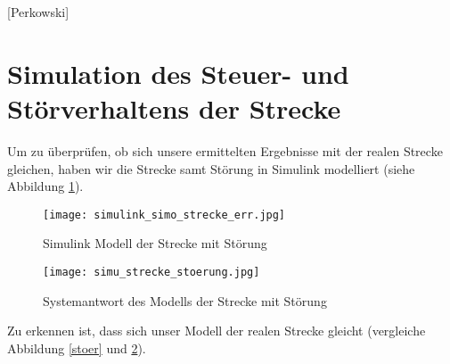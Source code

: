 
\newpage

[Perkowski]
\section{Simulation des Steuer- und Störverhaltens der Strecke} \label{Kapitel5}
Um zu überprüfen, ob sich unsere ermittelten Ergebnisse mit der realen Strecke gleichen, haben wir die Strecke samt Störung in Simulink modelliert (siehe Abbildung \ref{simustreckestor}).

\begin{figure}[h]
	\begin{center}
		\texttt{[image: simulink\_simo\_strecke\_err.jpg]}
		\caption{Simulink Modell der Strecke mit Störung}
       \label{simustreckestor}
	\end{center} 
\end{figure}


\begin{figure}[h]
	\begin{center}
		\texttt{[image: simu\_strecke\_stoerung.jpg]}
		\caption{Systemantwort des Modells der Strecke mit Störung}
       \label{plotsimustreckestor}
	\end{center} 
\end{figure}

Zu erkennen ist, dass sich unser Modell der realen Strecke gleicht (vergleiche Abbildung \ref{stoer} und \ref{plotsimustreckestor}).